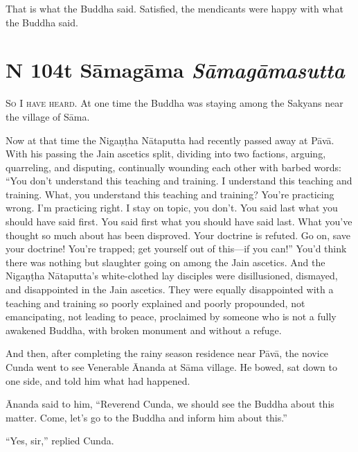 \documentclass[12pt,openany]{book}%
\newcommand*{\suttatitleacronym}[1]{\smaller[2]{#1}\vspace*{.3em}}
\newcommand*{\suttatitletranslation}[1]{\linebreak{#1}}
\newcommand*{\suttatitleroot}[1]{\linebreak\smaller[2]\itshape{#1}}
\newcommand*{\tocacronym}[1]{\hspace*{-3.3em}{#1}\quad}
\newcommand*{\toctranslation}[1]{#1}
\newcommand*{\tocroot}[1]{(\textit{#1})}
\newcommand*{\scevam}[1]{\textsc{#1}}
\begin{document}
That is what the Buddha said. Satisfied, the mendicants were happy with what the Buddha said. 

%
\section*{{\suttatitleacronym MN 104}{\suttatitletranslation At Sāmagāma }{\suttatitleroot Sāmagāmasutta}}
\addcontentsline{toc}{section}{\tocacronym{MN 104} \toctranslation{At Sāmagāma } \tocroot{Sāmagāmasutta}}

\scevam{So I have heard. }At one time the Buddha was staying among the Sakyans near the village of \textsanskrit{Sāma}. 

Now at that time the \textsanskrit{Nigaṇṭha} \textsanskrit{Nātaputta} had recently passed away at \textsanskrit{Pāvā}. With his passing the Jain ascetics split, dividing into two factions, arguing, quarreling, and disputing, continually wounding each other with barbed words: “You don’t understand this teaching and training. I understand this teaching and training. What, you understand this teaching and training? You’re practicing wrong. I’m practicing right. I stay on topic, you don’t. You said last what you should have said first. You said first what you should have said last. What you’ve thought so much about has been disproved. Your doctrine is refuted. Go on, save your doctrine! You’re trapped; get yourself out of this—if you can!” You’d think there was nothing but slaughter going on among the Jain ascetics. And the \textsanskrit{Nigaṇṭha} \textsanskrit{Nātaputta}’s white-clothed lay disciples were disillusioned, dismayed, and disappointed in the Jain ascetics. They were equally disappointed with a teaching and training so poorly explained and poorly propounded, not emancipating, not leading to peace, proclaimed by someone who is not a fully awakened Buddha, with broken monument and without a refuge. 

And then, after completing the rainy season residence near \textsanskrit{Pāvā}, the novice Cunda went to see Venerable Ānanda at \textsanskrit{Sāma} village. He bowed, sat down to one side, and told him what had happened. 

Ānanda said to him, “Reverend Cunda, we should see the Buddha about this matter. Come, let’s go to the Buddha and inform him about this.” 

“Yes, sir,” replied Cunda. 
\end{document}
